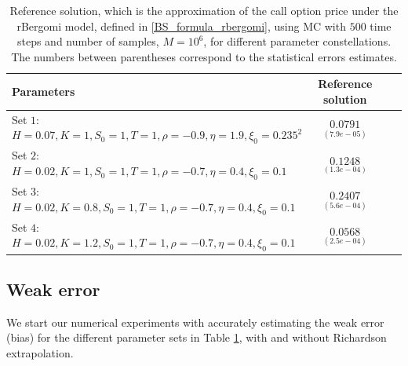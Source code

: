 \FloatBarrier
\begin{table}[!h]
	\centering
	\begin{small}
	\begin{tabular}{l*{2}{c}r}
	\toprule[1.5pt]
		Parameters            & Reference solution    \\
		\hline

			Set $1$:	$H=0.07, K=1,S_0=1, T=1, \rho=-0.9, \eta=1.9,\xi_0=0.235^2$   & $\underset{(7.9e-05)}{0.0791}$  \\	

				Set $2$:	$H=0.02, K=1, S_0=1, T=1,\rho=-0.7, \eta=0.4,\xi_0=0.1$   & $\underset{(1.3e-04)}{0.1248}$  \\
					Set $3$:	$H=0.02, K=0.8,S_0=1,T=1, \rho=-0.7, \eta=0.4,\xi_0=0.1$   & $\underset{(5.6e-04)}{0.2407}$  \\
						Set $4$:	$H=0.02, K=1.2,S_0=1,T=1, \rho=-0.7, \eta=0.4,\xi_0=0.1$   & $\underset{(2.5e-04)}{0.0568}$  \\
	\bottomrule[1.25pt]
	\end{tabular}
\end{small}
	\caption{Reference solution, which is the  approximation of the call option price under the rBergomi model, defined in \eqref{BS_formula_rbergomi},  using MC with $500$ time steps and number of samples, $M=10^6$, for different parameter constellations.  The numbers between parentheses correspond to the statistical errors estimates.}
	\label{table:Reference solution, using MC with $500$ time steps, of Call option price under rBergomi model, for different parameter constellation.}
\end{table}
\FloatBarrier

\subsection{Weak error} \label{sec:Weak error plots_no_change}
We start our numerical experiments with accurately  estimating the weak error (bias)  for the different parameter sets  in Table \ref{table:Reference solution, using MC with $500$ time steps, of Call option price under rBergomi model, for different parameter constellation.}, with and without Richardson extrapolation.  

